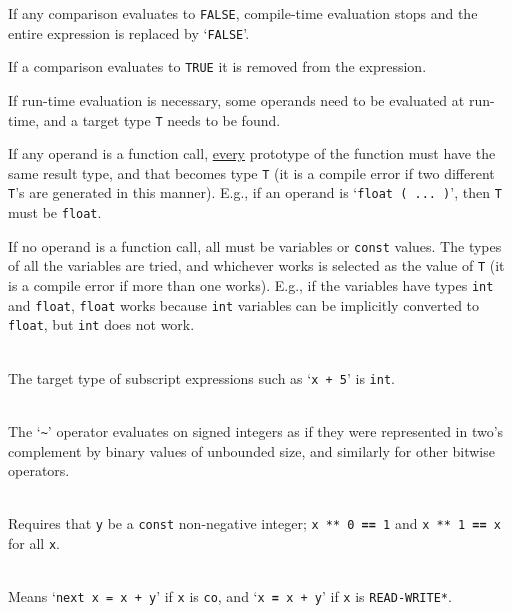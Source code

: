 \documentclass[12pt]{article}
\newcommand{\TT}[1]{{\tt \bfseries #1}}
\newenvironment{indpar}[1][0.3in]%
	{\begin{list}{}%
		     {\setlength{\itemsep}{0in}%
		      \setlength{\topsep}{0in}%
		      \setlength{\parsep}{1ex}%
		      \setlength{\labelwidth}{#1}%
		      \setlength{\leftmargin}{#1}%
		      \addtolength{\leftmargin}{\labelsep}}%
	 \item}%
	{\end{list}}
\begin{document}
\begin{indpar}
      If any comparison evaluates to {\tt FALSE},
      compile-time evaluation stops and the entire expression is replaced by
      `{\tt FALSE}'.

      If a comparison evaluates to {\tt TRUE} it is removed from the expression.

      If run-time evaluation is necessary,
      some operands need to be evaluated
      at run-time, and a target type {\tt T} needs to be found.

      If any operand is a function call, \underline{every} prototype
      of the function must have the same result type, and that becomes
      type {\tt T} (it is a compile error if two different {\tt T}'s
      are generated in this manner).
      E.g., if an operand is `{\tt float ( ... )}', then {\tt T} must
      be {\tt float}.

      If no operand is a function call, all must be variables or
      {\tt const} values.  The types of all the variables are tried,
      and whichever works is selected as the value of {\tt T} (it
      is a compile error if more than one works).  E.g., if the
      variables have types {\tt int} and {\tt float}, {\tt float}
      works because {\tt int} variables can be implicitly
      converted to {\tt float}, but {\tt int} does not work.

\hspace*{-0.2in}{\tt v[x+5] \TT{=} y} \\
      The target type of subscript expressions such as `{\tt x + 5}'
      is {\tt int}.

\hspace*{-0.2in}{\tt \TT{\textasciitilde} x} \\
       The `{\tt \textasciitilde}' operator
       evaluates on signed integers as if they were represented
       in two's complement by binary values of unbounded size,
       and similarly for other bitwise operators.

\hspace*{-0.2in}{\tt x \TT{**} y} \\
       Requires that {\tt y} be a {\tt const} non-negative integer;
       {\tt x ** 0 \TT{==} 1} and {\tt x ** 1 \TT{==} x} for all {\tt x}.

\hspace*{-0.2in}{\tt x \TT{+=} y} \\
	Means `{\tt next x = x + y}' if {\tt x} is {\tt co},
	and `{\tt x \TT{=} x + y}' if {\tt x} is {\tt *READ-WRITE*}.
\end{indpar}
\end{document}
